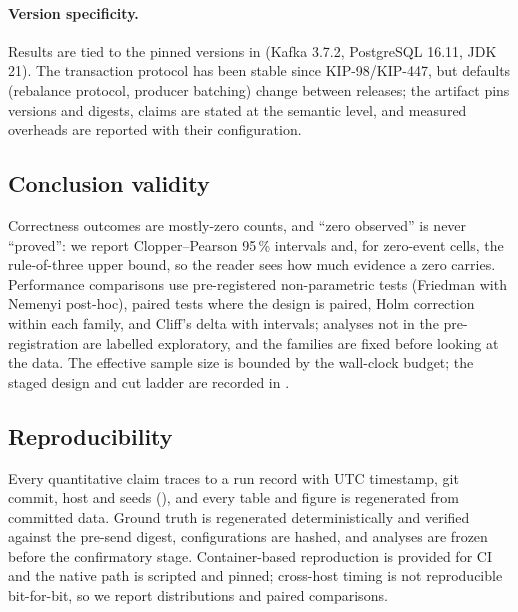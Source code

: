 \paragraph{Version specificity.} Results are tied to the pinned versions in
 (Kafka 3.7.2, PostgreSQL 16.11, JDK 21). The transaction
protocol has been stable since KIP-98/KIP-447, but defaults (rebalance protocol, producer
batching) change between releases; the artifact pins versions and digests, claims are stated at
the semantic level, and measured overheads are reported with their configuration.

\subsection{Conclusion validity}
\label{sec:threats-conclusion}

Correctness outcomes are mostly-zero counts, and ``zero observed'' is never ``proved'': we
report Clopper--Pearson 95\,\% intervals and, for zero-event cells, the rule-of-three upper
bound, so the reader sees how much evidence a zero carries. Performance comparisons use
pre-registered non-parametric tests (Friedman with Nemenyi post-hoc), paired tests where the
design is paired, Holm correction within each family, and Cliff's delta with intervals; analyses
not in the pre-registration are labelled exploratory, and the families are fixed before looking
at the data. The effective sample size is bounded by the wall-clock budget; the staged design and
cut ladder are recorded in .

\subsection{Reproducibility}
\label{sec:threats-repro}

Every quantitative claim traces to a run record with UTC timestamp, git commit, host and seeds
(), and every table and figure is regenerated from committed data. Ground
truth is regenerated deterministically and verified against the pre-send digest, configurations
are hashed, and analyses are frozen before the confirmatory stage. Container-based reproduction is
provided for CI and the native path is scripted and pinned; cross-host timing is not reproducible
bit-for-bit, so we report distributions and paired comparisons.
